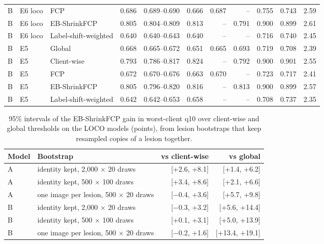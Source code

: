 \documentclass[10pt]{article}
\begin{document}
\begin{table}[!htbp]
\begin{tabular}{@{}lllrrrrrrrr@{}}
B & E6 loco & FCP & 0.686 & 0.689--0.690 & 0.666 & 0.687 & -- & 0.755 & 0.743 & 2.59 \\
B & E6 loco & EB-ShrinkFCP & 0.805 & 0.804--0.809 & 0.813 & -- & 0.791 & 0.900 & 0.899 & 2.61 \\
B & E6 loco & Label-shift-weighted & 0.640 & 0.640--0.643 & 0.640 & -- & -- & 0.716 & 0.740 & 2.45 \\
\midrule
B & E5 & Global & 0.668 & 0.665--0.672 & 0.651 & 0.665 & 0.693 & 0.719 & 0.708 & 2.39 \\
B & E5 & Client-wise & 0.793 & 0.786--0.817 & 0.824 & -- & 0.792 & 0.900 & 0.901 & 2.55 \\
B & E5 & FCP & 0.672 & 0.670--0.676 & 0.663 & 0.670 & -- & 0.723 & 0.717 & 2.41 \\
B & E5 & EB-ShrinkFCP & 0.805 & 0.796--0.820 & 0.816 & -- & 0.813 & 0.900 & 0.899 & 2.57 \\
B & E5 & Label-shift-weighted & 0.642 & 0.642--0.653 & 0.658 & -- & -- & 0.708 & 0.737 & 2.35 \\
\bottomrule
\end{tabular}
\end{table}
\begin{table}[!htbp]
\centering
\footnotesize
\caption{95\% intervals of the EB-ShrinkFCP gain in worst-client q10 over client-wise and global thresholds on the LOCO models (points), from lesion bootstraps that keep resampled copies of a lesion together.}
\label{tab:s6boot}
\begin{tabular}{@{}llrr@{}}
\toprule
Model & Bootstrap & vs client-wise & vs global \\
\midrule
A & identity kept, 2,000 $\times$ 20 draws & [+2.6, +8.1] & [+1.4, +6.2] \\
A & identity kept, 500 $\times$ 100 draws & [+3.4, +8.6] & [+2.1, +6.6] \\
A & one image per lesion, 500 $\times$ 20 draws & [$-$0.4, +3.6] & [+5.7, +9.8] \\
B & identity kept, 2,000 $\times$ 20 draws & [$-$0.3, +3.2] & [+5.6, +14.4] \\
B & identity kept, 500 $\times$ 100 draws & [+0.1, +3.1] & [+5.0, +13.9] \\
B & one image per lesion, 500 $\times$ 20 draws & [$-$0.2, +1.6] & [+13.4, +19.1] \\
\bottomrule
\end{tabular}
\end{table}
\end{document}
